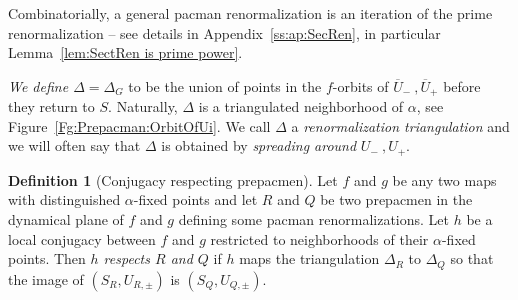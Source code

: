 \documentclass[]{amsart}
\newcommand{\bDelta}{{\mathbb{\Delta}}}
\theoremstyle{remark}
\numberwithin{equation}{section}
\theoremstyle{definition}
\newtheorem{defn}[thm]{Definition}
\begin{document}
Combinatorially, a general pacman renormalization is an iteration of the prime renormalization -- see details in Appendix~\ref{ss:ap:SecRen}, in particular Lemma~\ref{lem:SectRen is prime power}.

\emph{We define $\bDelta=\bDelta_G$} to be the union of points in the $f$-orbits of $\overline U_-~,\overline U_+$ before they return to $S$. Naturally, $\bDelta$ is a triangulated neighborhood of $\alpha$, see Figure~\ref{Fg:Prepacman:OrbitOfUi}. We call $\bDelta$ a \emph{renormalization triangulation} and we will often say that $\bDelta$ is obtained by \emph{spreading around} $U_-~,U_+$.


\begin{defn}[Conjugacy respecting prepacmen]
\label{defn:ConjBetweenPreRenorm}
Let $f$ and $g$ be any two maps with distinguished $\alpha$-fixed points and let $R$ and $Q$ be two prepacmen in the dynamical plane of $f$ and $g$ defining some pacman renormalizations. Let $h$ be a local conjugacy between $f$ and $g$ restricted to neighborhoods of their $\alpha$-fixed points. Then \emph{$h$ respects $R$ and $Q$} if $h$ maps the triangulation $\bDelta_R$ to $\bDelta_Q$ so that the image of $(S_R, U_{R,\pm})$ is $(S_Q,U_{Q,\pm})$.
\end{defn}
\end{document}
